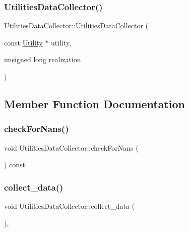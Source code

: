 \subsubsection{\texorpdfstring{Utilities\+Data\+Collector()}{UtilitiesDataCollector()}}
{\footnotesize\ttfamily Utilities\+Data\+Collector\+::\+Utilities\+Data\+Collector (\begin{DoxyParamCaption}\item[{const \mbox{\hyperlink{classUtility}{Utility}} $\ast$}]{utility,  }\item[{unsigned long}]{realization }\end{DoxyParamCaption})\hspace{0.3cm}{\ttfamily [explicit]}}



\subsection{Member Function Documentation}
\mbox{\label{classUtilitiesDataCollector_af01392bbfae02a1fd9ee65b3c97a73a3_af01392bbfae02a1fd9ee65b3c97a73a3}} 
\subsubsection{\texorpdfstring{check\+For\+Nans()}{checkForNans()}}
{\footnotesize\ttfamily void Utilities\+Data\+Collector\+::check\+For\+Nans (\begin{DoxyParamCaption}{ }\end{DoxyParamCaption}) const}

\mbox{\label{classUtilitiesDataCollector_ab72c4432d6816beb1f4f4b354fb3023d_ab72c4432d6816beb1f4f4b354fb3023d}} 
\subsubsection{\texorpdfstring{collect\+\_\+data()}{collect\_data()}}
{\footnotesize\ttfamily void Utilities\+Data\+Collector\+::collect\+\_\+data (\begin{DoxyParamCaption}{ }\end{DoxyParamCaption})\hspace{0.3cm}{\ttfamily [override]}, {\ttfamily [virtual]}}



